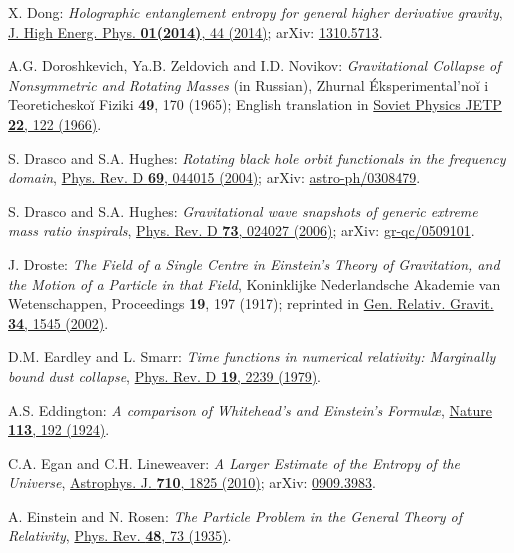 \begin{thebibliography}{123}
X. Dong:
{\em Holographic entanglement entropy for general higher derivative gravity},
\href{https://doi.org/10.1007/JHEP01(2014)044}{J. High Energ. Phys. {\bf 01(2014)}, 44 (2014)};
arXiv: \href{https://arxiv.org/abs/1310.5713}{1310.5713}.

A.G. Doroshkevich, Ya.B. Zeldovich and I.D. Novikov:
{\em Gravitational Collapse of Nonsymmetric and Rotating Masses} (in Russian),
Zhurnal Éksperimental'noĭ i Teoreticheskoĭ Fiziki {\bf 49}, 170 (1965);
English translation in
\href{http://jetp.ras.ru/cgi-bin/e/index/e/22/1/p122?a=list}{Soviet Physics JETP {\bf 22}, 122 (1966)}.

S. Drasco and S.A. Hughes:
{\em Rotating black hole orbit functionals in the frequency domain},
\href{https://doi.org/10.1103/PhysRevD.69.044015}{Phys. Rev. D {\bf 69}, 044015 (2004)};
arXiv: \href{https://arxiv.org/abs/astro-ph/0308479}{astro-ph/0308479}.

S. Drasco and S.A. Hughes:
{\em Gravitational wave snapshots of generic extreme mass ratio inspirals},
\href{https://doi.org/10.1103/PhysRevD.73.024027}{Phys. Rev. D {\bf 73}, 024027 (2006)};
arXiv: \href{https://arxiv.org/abs/gr-qc/0509101}{gr-qc/0509101}.

J. Droste:
{\em The Field of a Single Centre in Einstein's Theory of Gravitation, and the Motion of a Particle in that Field},
Koninklijke Nederlandsche Akademie van Wetenschappen, Proceedings {\bf 19}, 197 (1917);
reprinted in \href{https://doi.org/10.1023/A:1020747322668}{Gen. Relativ. Gravit. {\bf 34}, 1545 (2002)}.

D.M. Eardley and L. Smarr:
{\em Time functions in numerical relativity: Marginally bound dust collapse},
\href{https://doi.org/10.1103/PhysRevD.19.2239}{Phys. Rev. D {\bf 19}, 2239 (1979)}.

A.S. Eddington: {\em A comparison of Whitehead's and Einstein's Formul\ae},
\href{https://doi.org/10.1038/113192a0}{Nature {\bf 113}, 192 (1924)}.

C.A. Egan and C.H. Lineweaver:
{\em A Larger Estimate of the Entropy of the Universe},
\href{https://doi.org/10.1088/0004-637X/710/2/1825}{Astrophys. J. {\bf 710}, 1825 (2010)};
arXiv: \href{https://arxiv.org/abs/0909.3983}{0909.3983}.

A. Einstein and N. Rosen:
{\em The Particle Problem in the General Theory of Relativity},
\href{https://doi.org/10.1103/PhysRev.48.73}{Phys. Rev. {\bf 48}, 73 (1935)}.


\end{thebibliography}

